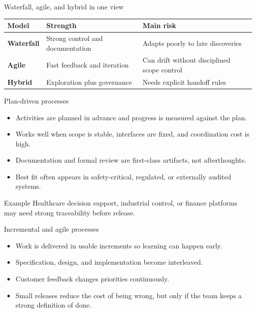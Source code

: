 \begin{frame}{Waterfall, agile, and hybrid in one view}
\begin{tabularx}{\textwidth}{>{\bfseries}l X X}
Model & Strength & Main risk \\
\toprule
Waterfall & Strong control and documentation & Adapts poorly to late discoveries \\
Agile & Fast feedback and iteration & Can drift without disciplined scope control \\
Hybrid & Exploration plus governance & Needs explicit handoff rules \\
\bottomrule
\end{tabularx}
\coursefooter
\end{frame}

\begin{frame}{Plan-driven processes}
\begin{itemize}
\item Activities are planned in advance and progress is measured against the plan.
\item Works well when scope is stable, interfaces are fixed, and coordination cost is high.
\item Documentation and formal review are first-class artifacts, not afterthoughts.
\item Best fit often appears in safety-critical, regulated, or externally audited systems.
\end{itemize}
\begin{block}{Example}
Healthcare decision support, industrial control, or finance platforms may need strong traceability before release.
\end{block}
\coursefooter
\end{frame}

\begin{frame}{Incremental and agile processes}
\begin{itemize}
\item Work is delivered in usable increments so learning can happen early.
\item Specification, design, and implementation become interleaved.
\item Customer feedback changes priorities continuously.
\item Small releases reduce the cost of being wrong, but only if the team keeps a strong definition of done.
\end{itemize}
\coursefooter
\end{frame}

